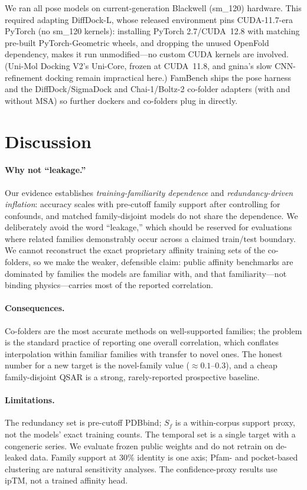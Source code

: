 \documentclass[11pt]{article}
\begin{document}
We ran all pose models on current-generation Blackwell (sm\_120) hardware. This required adapting DiffDock-L,
whose released environment pins CUDA-11.7-era PyTorch (no sm\_120 kernels): installing PyTorch
2.7/CUDA~12.8 with matching pre-built PyTorch-Geometric wheels, and dropping the unused OpenFold
dependency, makes it run unmodified---no custom CUDA kernels are involved. (Uni-Mol Docking V2's
Uni-Core, frozen at CUDA~11.8, and gnina's slow CNN-refinement docking remain impractical here.)
FamBench ships the pose harness and the DiffDock/SigmaDock and Chai-1/Boltz-2 co-folder adapters
(with and without MSA) so further dockers and co-folders plug in directly.

\section{Discussion}

\paragraph{Why not ``leakage.''} Our evidence establishes \emph{training-familiarity dependence}
and \emph{redundancy-driven inflation}: accuracy scales with pre-cutoff family support after
controlling for confounds, and matched family-disjoint models do not share the dependence. We
deliberately avoid the word ``leakage,'' which should be reserved for evaluations where related
families demonstrably occur across a claimed train/test boundary. We cannot reconstruct the exact
proprietary affinity training sets of the co-folders, so we make the weaker, defensible claim:
public affinity benchmarks are dominated by families the models are familiar with, and that
familiarity---not binding physics---carries most of the reported correlation.

\paragraph{Consequences.} Co-folders are the most accurate methods on well-supported families;
the problem is the standard practice of reporting one overall correlation, which conflates
interpolation within familiar families with transfer to novel ones. The honest number for a new
target is the novel-family value ($\approx 0.1$--$0.3$), and a cheap family-disjoint QSAR is a
strong, rarely-reported prospective baseline.

\paragraph{Limitations.} The redundancy set is pre-cutoff PDBbind; $S_f$ is a within-corpus
support proxy, not the models' exact training counts. The temporal set is a single target with a
congeneric series. We evaluate frozen public weights and do not retrain on de-leaked data. Family
support at 30\% identity is one axis; Pfam- and pocket-based clustering are natural sensitivity
analyses. The confidence-proxy results use ipTM, not a trained affinity head.
\end{document}
